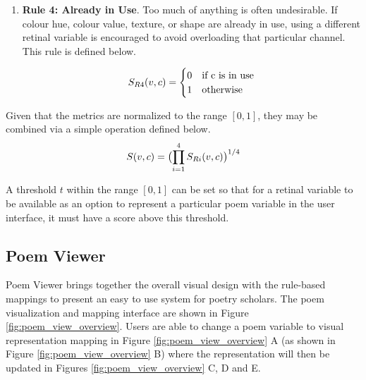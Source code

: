 \begin{enumerate}
\item \textbf{Rule 4: Already in Use}. Too much of anything is often undesirable. If colour hue, colour value, texture, or shape are already in use, using a different retinal variable is encouraged to avoid overloading that particular channel. 
This rule is defined below.

\[
\vspace{-2mm}
	S_{R4}(v, c) = \begin{cases}
	0 & \text{if }$c$\text{ is in use} \\
	1 & \text{otherwise}
	\end{cases}
\vspace{-1mm}
\]

\end{enumerate}

Given that the metrics are normalized to the range $[0,1]$, they may be combined via a simple operation defined below.
\[
\vspace{-1mm}
	S(v, c) = \bigl ( \prod_{i=1}^4 S_{Ri}(v, c) \bigr ) ^{1/4}
\]

A threshold $t$ within the range $[0,1]$ can be set so that for a retinal variable to be available as an option to represent a particular poem variable in the user interface, it must have a score above this threshold. 

\subsection{Poem Viewer}
Poem Viewer brings together the overall visual design with the rule-based mappings to present an easy to use system for poetry scholars. 
The poem visualization and mapping interface are shown in Figure \ref{fig:poem_view_overview}. 
Users are able to change a poem variable to visual representation mapping in Figure \ref{fig:poem_view_overview} A (as shown in Figure \ref{fig:poem_view_overview} B) where the representation will then be updated in Figures \ref{fig:poem_view_overview} C, D and E. 

